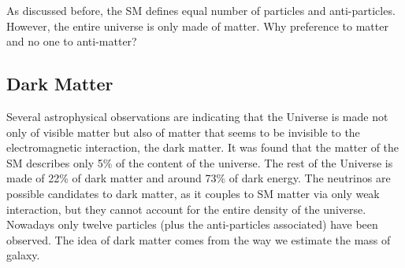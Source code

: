     As discussed before, the SM defines equal number of particles and anti-particles. 
    However, the entire universe is only made of matter. 
    Why preference to matter and no one to anti-matter? 

    \subsection{Dark Matter}
    
    Several astrophysical observations are indicating that the Universe is made not only of visible matter but also of matter that seems to be invisible to the electromagnetic interaction, the dark matter.
    It was found that the matter of the SM describes only 5\% of the content of the universe. 
    The rest of the Universe is made of 22\% of dark matter and around 73\% of dark energy.
    The neutrinos are possible candidates to dark matter, as it couples to SM matter via only weak interaction, but they cannot account for the entire density of the universe.
    Nowadays only twelve particles (plus the anti-particles associated) have been observed. 
    The idea of dark matter comes from the way we estimate the mass of galaxy.

